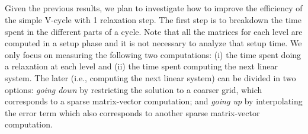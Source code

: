 \subsection{}

Given the previous results, we plan to investigate how to improve the
efficiency of the simple V-cycle with 1 relaxation step. The first step is to
breakdown the time spent in the different parts of a cycle. Note that all the
matrices for each level are computed in a setup phase and it is not necessary
to analyze that setup time. We only focus on measuring the following two
computations: (i) the time spent doing a relaxation at each level and (ii) the
time spent computing the next linear system. The later (i.e., computing the
next linear system) can be divided in two options: \emph{going down} by
restricting the solution to a coarser grid, which corresponds to a sparse
matrix-vector computation; and \emph{going up} by interpolating the error term
which also corresponds to another sparse matrix-vector computation.

\begin{table}
 \caption{Time breakdown of a V-cycle with $\alpha=1$.}
 \label{table.measures}
\end{table}

